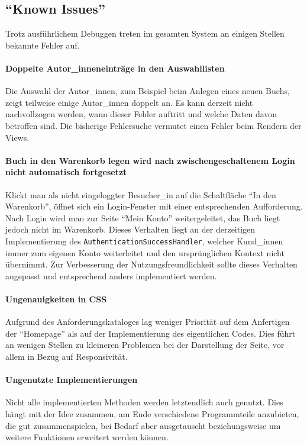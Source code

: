 	\subsection{"`Known Issues"'}
	Trotz ausführlichem Debuggen treten im gesamten System an einigen Stellen bekannte Fehler auf.
	
		\paragraph{Doppelte Autor\_inneneinträge in den Auswahllisten}
		Die Auswahl der Autor\_innen, zum Beispiel beim Anlegen eines neuen Buchs, zeigt teilweise einige Autor\_innen doppelt an. Es kann derzeit nicht nachvollzogen werden, wann dieser Fehler auftritt und welche Daten davon betroffen sind. Die bisherige Fehlersuche vermutet einen Fehler beim Rendern der Views.
		
		\paragraph{Buch in den Warenkorb legen wird nach zwischengeschaltenem Login nicht automatisch fortgesetzt}
		Klickt man als nicht eingeloggter Besucher\_in auf die Schaltfläche "`In den Warenkorb"', öffnet sich ein Login-Fenster mit einer entsprechenden Aufforderung. Nach Login wird man zur Seite "`Mein Konto"' weitergeleitet, das Buch liegt jedoch nicht im Warenkorb. Dieses Verhalten liegt an der derzeitigen Implementierung des \lstinline|AuthenticationSuccessHandler|, welcher Kund\_innen immer zum eigenen Konto weiterleitet und den ursprünglichen Kontext nicht übernimmt. Zur Verbesserung der Nutzungsfreundlichkeit sollte dieses Verhalten angepasst und entsprechend anders implementiert werden.
		
		\paragraph{Ungenauigkeiten in CSS}
		Aufgrund des Anforderungskataloges lag weniger Priorität auf dem Anfertigen der "`Homepage"' als auf der Implementierung des eigentlichen Codes. Dies führt an wenigen Stellen zu kleineren Problemen bei der Darstellung der Seite, vor allem in Bezug auf Responsivität.
	
		\paragraph{Ungenutzte Implementierungen}
		Nicht alle implementierten Methoden werden letztendlich auch genutzt. Dies hängt mit der Idee zusammen, am Ende verschiedene Programmteile anzubieten, die gut zusammenspielen, bei Bedarf aber ausgetauscht be\-zie\-hungs\-weise um weitere Funktionen erweitert werden können.
